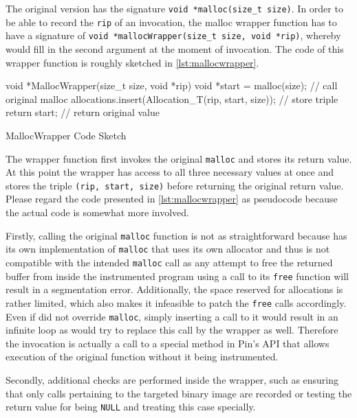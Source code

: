 The original version has the signature \texttt{void *malloc(size_t size)}. In order to be able to
record the \texttt{rip} of an invocation, the malloc wrapper function has to have a signature of 
\texttt{void *mallocWrapper(size_t size, void *rip)}, whereby \pin would fill in the second argument
at the moment of invocation. The code of this wrapper function is roughly sketched in \cref{lst:mallocwrapper}.

\begin{listing}[htb]
\centering
\begin{cppcode}
void *MallocWrapper(size_t size, void *rip) {
	void *start = malloc(size); // call original malloc
	allocations.insert(Allocation_T(rip, start, size)); // store triple
	return start; // return original value
}
\end{cppcode}
\caption{MallocWrapper Code Sketch}
\label{lst:mallocwrapper}
\end{listing}

The wrapper function first invokes the original \texttt{malloc} and stores its return value. At this point the
wrapper has access to all three necessary values at once and stores the triple \texttt{(rip, start, size)}
before returning the original return value. Please regard the code presented in \cref{lst:mallocwrapper} as
pseudocode because the actual code is somewhat more involved.

Firstly, calling the original \texttt{malloc} function is not as straightforward because \pin has its own
implementation of \texttt{malloc} that uses its own allocator and thus is not compatible with the intended
\texttt{malloc} call as any attempt to free the returned buffer from inside the instrumented program using a
call to its \texttt{free} function will result in a segmentation error. Additionally, the space reserved for
\pin allocations is rather limited, which also makes it infeasible to patch the \texttt{free} calls
accordingly. Even if \pin did not override \texttt{malloc}, simply inserting a call to it would result in an
infinite loop as \pin would try to replace this call by the wrapper as well. Therefore the invocation is
actually a call to a special method in Pin's API that allows execution of the original function
without it being instrumented.

Secondly, additional checks are performed inside the wrapper, such as ensuring that only calls pertaining to
the targeted binary image are recorded or testing the return value for being \texttt{NULL} and treating this
case specially.


